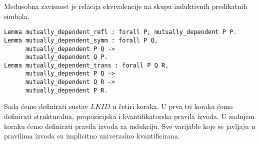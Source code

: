 \begin{lemma}
  Međusobna zavisnost je relacija ekvivalencije na skupu induktivnih predikatnih simbola. 
\begin{verbatim}
Lemma mutually_dependent_refl : forall P, mutually_dependent P P.
Lemma mutually_dependent_symm : forall P Q,
      mutually_dependent P Q ->
      mutually_dependent Q P.
Lemma mutually_dependent_trans : forall P Q R,
      mutually_dependent P Q ->
      mutually_dependent Q R ->
      mutually_dependent P R.
\end{verbatim}
\end{lemma}

Sada ćemo definirati sustav \(\mathit{LKID}\) u četiri koraka.
U prva tri koraka ćemo definirati strukturalna, propozicijska i kvantifikatorska pravila izvoda. U zadnjem koraku ćemo definirati pravila izvoda za indukciju. Sve varijable koje se javljaju u pravilima izvoda su implicitno univerzalno kvantificirana.


